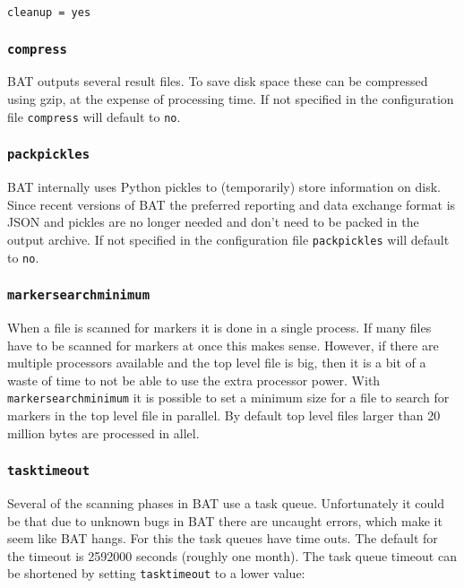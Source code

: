 \documentclass[10pt,a4paper]{article}
\begin{document}
\begin{verbatim}
cleanup = yes
\end{verbatim}

\subsubsection{\texttt{compress}}

BAT outputs several result files. To save disk space these can be compressed
using gzip, at the expense of processing time. If not specified in the
configuration file \texttt{compress} will default to \texttt{no}.

\subsubsection{\texttt{packpickles}}

BAT internally uses Python pickles to (temporarily) store information on
disk. Since recent versions of BAT the preferred reporting and data exchange
format is JSON and pickles are no longer needed and don't need to be packed in
the output archive. If not specified in the configuration file
\texttt{packpickles} will default to \texttt{no}.

\subsubsection{\texttt{markersearchminimum}}

When a file is scanned for markers it is done in a single process. If many
files have to be scanned for markers at once this makes sense. However, if
there are multiple processors available and the top level file is big, then
it is a bit of a waste of time to not be able to use the extra processor
power. With \texttt{markersearchminimum} it is possible to set a minimum
size for a file to search for markers in the top level file in parallel. By
default top level files larger than 20 million bytes are processed in
allel.

\subsubsection{\texttt{tasktimeout}}

Several of the scanning phases in BAT use a task queue. Unfortunately it could
be that due to unknown bugs in BAT there are uncaught errors, which make it
seem like BAT hangs. For this the task queues have time outs. The default for
the timeout is 2592000 seconds (roughly one month). The task queue timeout can
be shortened by setting \texttt{tasktimeout} to a lower value:
\end{document}
